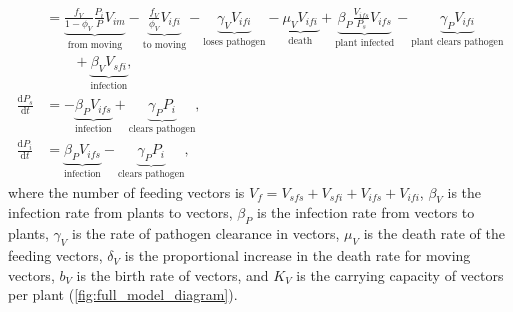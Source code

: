 \documentclass{article}
\newcommand{\md}{\mathrm{d}}
\begin{document}
\begin{equation}
\begin{split}
    &=
    \underbrace{\frac{f_V}{1 - \phi_V} \frac{P_i}{P} V_{im}}_{\text{from moving}}
    - \underbrace{\frac{f_V}{\phi_V} V_{ifi}}_{\text{to moving}}
    - \underbrace{\gamma_V V_{ifi}}_{\text{loses pathogen}}
    - \underbrace{\mu_V V_{ifi}}_{\text{death}}
    + \underbrace{\beta_P \frac{V_{ifs}}{P_s} V_{ifs}}_{\text{plant infected}}
    - \underbrace{\gamma_P V_{ifi}}_{\text{plant clears pathogen}}
    \\ & \quad\quad {}
    + \underbrace{\beta_V V_{sfi}}_{\text{infection}},
    \\
    \frac{\md P_s}{\md t}
    &=
    - \underbrace{\beta_P V_{ifs}}_{\text{infection}}
    + \underbrace{\gamma_P P_i}_{\text{clears pathogen}},
    \\
    \frac{\md P_i}{\md t}
    &=
    \underbrace{\beta_P V_{ifs}}_{\text{infection}}
    - \underbrace{\gamma_P P_i}_{\text{clears pathogen}},
  \end{split}
\end{equation}
where the number of feeding vectors is
$V_f = V_{sfs} + V_{sfi} + V_{ifs} + V_{ifi}$, $\beta_V$ is the
infection rate from plants to vectors, $\beta_P$ is the infection rate
from vectors to plants, $\gamma_V$ is the rate of pathogen clearance
in vectors, $\mu_V$ is the death rate of the feeding vectors,
$\delta_V$ is the proportional increase in the death rate for moving
vectors, $b_V$ is the birth rate of vectors, and $K_V$ is the carrying
capacity of vectors per plant (\autoref{fig:full_model_diagram}).
\end{document}
